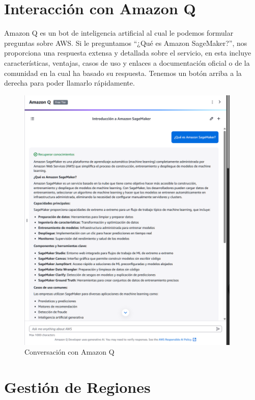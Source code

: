 \documentclass{article}
\begin{document}
	\newpage

	\section{Interacción con Amazon Q}

	Amazon Q es un bot de inteligencia artificial al cual le podemos formular preguntas sobre AWS. Si le preguntamos ``¿Qué es Amazon SageMaker?'', nos proporciona una respuesta extensa y detallada sobre el servicio, en esta incluye características, ventajas, casos de uso y enlaces a documentación oficial o de la comunidad en la cual ha basado su respuesta. Tenemos un botón arriba a la derecha para poder llamarlo rápidamente.

	\begin{figure}[h!]
	\centering
	\includegraphics[width=0.95\textwidth]{tarea_6.png}
	\caption{Conversación con Amazon Q}
	\end{figure}

	\newpage

	\section{Gestión de Regiones}
\end{document}
